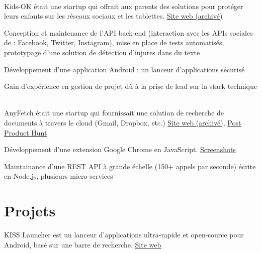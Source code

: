 \documentclass[
  french,
  a4paper
]{resume-openfont}
\begin{document}
\begin{minipage}[t]{0.66\textwidth}
%
%
\\
Kids-OK était une startup qui offrait aux parents des solutions pour protéger leurs enfants sur les réseaux sociaux et les tablettes. \href{https://i.imgur.com/ZAXWuZN.png}{Site web (archivé)}
\vspace{\topsep}
\begin{tightemize}
\item Conception et maintenance de l'API back-end (interaction avec les APIs sociales de : Facebook, Twitter, Instagram), mise en place de tests automatisés, prototypage d'une solution de détection d'injures dans du texte
\item Développement d'une application Android : un lanceur d'applications sécurisé
\item Gain d'expérience en gestion de projet dû à la prise de lead sur la stack technique
\end{tightemize}
\sectionsep

%
%
\\
AnyFetch était une startup qui fournissait une solution de recherche de documents à travers le cloud (Gmail, Dropbox, etc.) \href{https://i.imgur.com/B3MMD6Y.png}{Site web (archivé)}, \href{https://www.producthunt.com/posts/anyfetch}{Post Product Hunt}
\vspace{\topsep}
\begin{tightemize}
\item Développement d'une extension Google Chrome en JavaScript. \href{https://i.imgur.com/yql5v1z.png}{Screenshots}
\item Maintainance d'une REST API à grande échelle (150+ appels par seconde) écrite en Node.js, plusieurs micro-services
\end{tightemize}


\section{Projets}
%
%
KISS Launcher est un lanceur d'applications ultra-rapide et open-source pour Android, basé sur une barre de recherche. \href{http://kisslauncher.com/}{Site web}
\sectionsep

\end{minipage}
\end{document}

